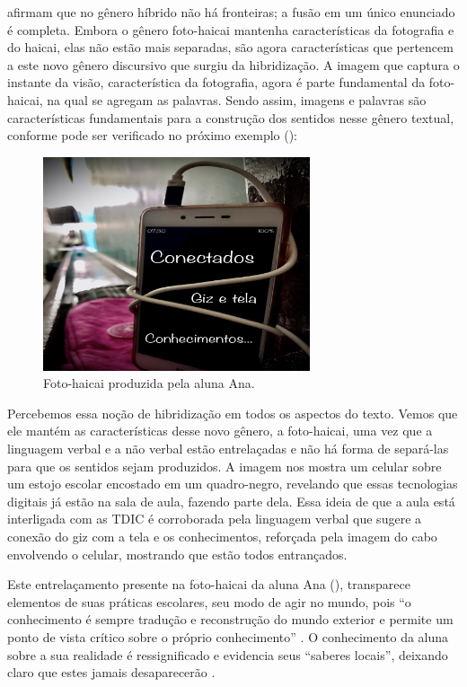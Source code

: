 \documentclass{textolivre}
\begin{document}
\textcite{barbosa2015} afirmam que no gênero híbrido não há fronteiras; a fusão em um único enunciado é completa. Embora o gênero foto-haicai mantenha características da fotografia e do haicai, elas não estão mais separadas, são agora características que pertencem a este novo gênero discursivo que surgiu da hibridização. A imagem que captura o instante da visão, característica da fotografia, agora é parte fundamental da foto-haicai, na qual se agregam as palavras. Sendo assim, imagens e palavras são características fundamentais para a construção dos sentidos nesse gênero textual, conforme pode ser verificado no próximo exemplo ():

\begin{figure}[h]
    \centering
    \includegraphics[width=0.7\textwidth]{figure07.png}
    \caption{Foto-haicai produzida pela aluna Ana.}
    \label{fig07}
\end{figure}

Percebemos essa noção de hibridização em todos os aspectos do texto. Vemos que ele mantém as características desse novo gênero, a foto-haicai, uma vez que a linguagem verbal e a não verbal estão entrelaçadas e não há forma de separá-las para que os sentidos sejam produzidos. A imagem nos mostra um celular sobre um estojo escolar encostado em um quadro-negro, revelando que essas tecnologias digitais já estão na sala de aula, fazendo parte dela. Essa ideia de que a aula está interligada com as TDIC é corroborada pela linguagem verbal que sugere a conexão do giz com a tela e os conhecimentos, reforçada pela imagem do cabo envolvendo o celular, mostrando que estão todos entrançados.

Este entrelaçamento presente na foto-haicai da aluna Ana (), transparece elementos de suas práticas escolares, seu modo de agir no mundo, pois “o conhecimento é sempre tradução e reconstrução do mundo exterior e permite um ponto de vista crítico sobre o próprio conhecimento” \cite[p. 53]{morin_saberes_2010}. O conhecimento da aluna sobre a sua realidade é ressignificado e evidencia seus “saberes locais”, deixando claro que estes jamais desaparecerão \cite{geertz1997}.
\end{document}
